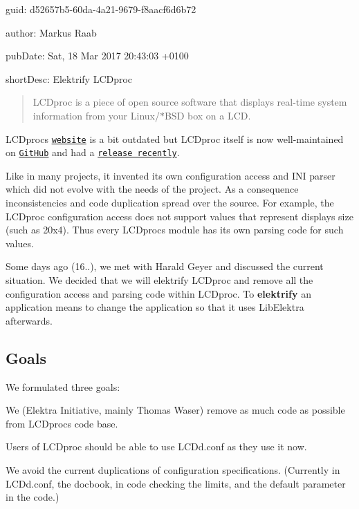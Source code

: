 
\begin{DoxyItemize}
\item guid\+: d52657b5-\/60da-\/4a21-\/9679-\/f8aacf6d6b72
\item author\+: Markus Raab
\item pub\+Date\+: Sat, 18 Mar 2017 20\+:43\+:03 +0100
\item short\+Desc\+: Elektrify L\+C\+Dproc
\end{DoxyItemize}

\begin{quote}
L\+C\+Dproc is a piece of open source software that displays real-\/time system information from your {\ttfamily Linux}/{\ttfamily $\ast$\+B\+SD} box on a L\+CD. \end{quote}


L\+C\+Dproc\textquotesingle{}s \href{http://lcdproc.omnipotent.net/}{\tt website} is a bit outdated but L\+C\+Dproc itself is now well-\/maintained on \href{https://github.com/lcdproc/lcdproc}{\tt Git\+Hub} and had a \href{https://github.com/lcdproc/lcdproc/releases}{\tt release recently}.

Like in many projects, it invented its own configuration access and I\+NI parser which did not evolve with the needs of the project. As a consequence inconsistencies and code duplication spread over the source. For example, the L\+C\+Dproc configuration access does not support values that represent display\textquotesingle{}s size (such as {\ttfamily 20x4}). Thus every L\+C\+Dproc\textquotesingle{}s module has its own parsing code for such values.

Some days ago (16..), we met with Harald Geyer and discussed the current situation. We decided that we will elektrify L\+C\+Dproc and remove all the configuration access and parsing code within L\+C\+Dproc. To {\bfseries elektrify} an application means to change the application so that it uses Lib\+Elektra afterwards.

\subsection*{Goals}

We formulated three goals\+:


\begin{DoxyEnumerate}
\item We (Elektra Initiative, mainly Thomas Waser) remove as much code as possible from L\+C\+Dproc\textquotesingle{}s code base.
\item Users of L\+C\+Dproc should be able to use {\ttfamily L\+C\+Dd.\+conf} as they use it now.
\item We avoid the current duplications of configuration specifications. (Currently in {\ttfamily L\+C\+Dd.\+conf}, the docbook, in code checking the limits, and the default parameter in the code.)
\end{DoxyEnumerate}

